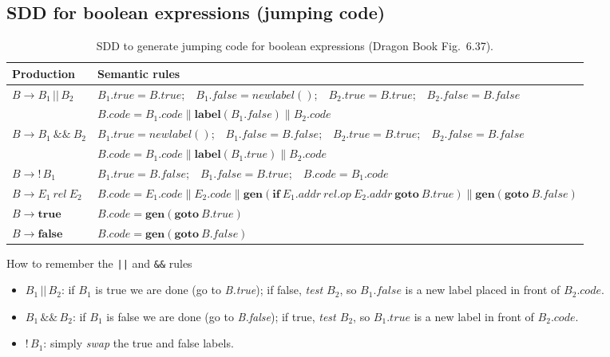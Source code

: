 \documentclass[11pt,a4paper]{article}
\newcommand{\kw}[1]{\textbf{#1}}
\newcommand{\gen}[1]{\ensuremath{\mathbf{gen}(#1)}}
\newcommand{\cc}{\mathbin{\|}}
\newcommand{\at}[2]{\ensuremath{#1.\mathit{#2}}}
\newcommand{\lbl}[1]{\ensuremath{\mathbf{label}(#1)}}
\newcommand{\goto}{\kw{goto}}
\begin{document}
\subsection{SDD for boolean expressions (jumping code)}
\begin{table}[htbp]
\centering
\small
\begin{tabular}{@{}L{3.1cm} L{11.5cm}@{}}
\toprule
\textbf{Production} & \textbf{Semantic rules} \\ \midrule
$B \to B_1 \,|\!|\, B_2$ &
$\at{B_1}{true}=\at{B}{true}$;\ \ $\at{B_1}{false}=\mathit{newlabel}()$;\ \ $\at{B_2}{true}=\at{B}{true}$;\ \ $\at{B_2}{false}=\at{B}{false}$\\
& $\at{B}{code}=\at{B_1}{code}\cc\lbl{\at{B_1}{false}}\cc\at{B_2}{code}$ \\[3pt]
$B \to B_1\ \&\&\ B_2$ &
$\at{B_1}{true}=\mathit{newlabel}()$;\ \ $\at{B_1}{false}=\at{B}{false}$;\ \ $\at{B_2}{true}=\at{B}{true}$;\ \ $\at{B_2}{false}=\at{B}{false}$\\
& $\at{B}{code}=\at{B_1}{code}\cc\lbl{\at{B_1}{true}}\cc\at{B_2}{code}$ \\[3pt]
$B \to !\,B_1$ &
$\at{B_1}{true}=\at{B}{false}$;\ \ $\at{B_1}{false}=\at{B}{true}$;\ \ $\at{B}{code}=\at{B_1}{code}$ \\[3pt]
$B \to E_1\ \mathit{rel}\ E_2$ &
$\at{B}{code}=\at{E_1}{code}\cc\at{E_2}{code}\cc\gen{\mathbf{if}\ \at{E_1}{addr}\ \mathit{rel.op}\ \at{E_2}{addr}\ \goto\ \at{B}{true}}\cc\gen{\goto\ \at{B}{false}}$ \\[3pt]
$B \to \mathbf{true}$ & $\at{B}{code}=\gen{\goto\ \at{B}{true}}$ \\[3pt]
$B \to \mathbf{false}$ & $\at{B}{code}=\gen{\goto\ \at{B}{false}}$ \\ \bottomrule
\end{tabular}
\caption{SDD to generate jumping code for boolean expressions (Dragon Book Fig.~6.37).}
\end{table}

\begin{notebox}{How to remember the \texttt{||} and \texttt{\&\&} rules}
\begin{itemize}[nosep]
\item $B_1 \,||\, B_2$: if $B_1$ is true we are done (go to \textit{B.true}); if false, \emph{test $B_2$}, so $B_1.\mathit{false}$ is a new label placed in front of $B_2.\mathit{code}$.
\item $B_1 \,\&\&\, B_2$: if $B_1$ is false we are done (go to \textit{B.false}); if true, \emph{test $B_2$}, so $B_1.\mathit{true}$ is a new label in front of $B_2.\mathit{code}$.
\item $!\,B_1$: simply \emph{swap} the true and false labels.
\end{itemize}
\end{notebox}
\end{document}
